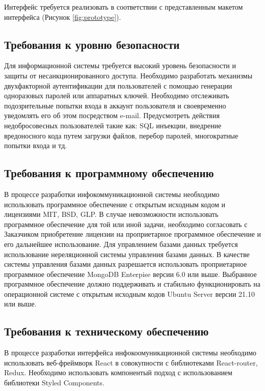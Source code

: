 \documentclass[14pt]{extreport}
\begin{document}
            Интерфейс требуется реализовать в соответствии с представленным макетом интерфейса (Рисунок \ref{fig:prototype}). 
     
        \subsection{Требования к уровню безопасности}
            
            Для информационной системы требуется высокий уровень безопасности и защиты от несанкционированного доступа. Необходимо разработать механизмы двухфакторной аутентификации для пользователей с помощью генерации одноразовых паролей или аппаратных ключей. Необходимо отслеживать подозрительные попытки входа в аккаунт пользователя и своевременно уведомлять его об этом посредством e-mail. Предусмотреть действия недобросовесных пользователей такие как: SQL инъекции, внедрение вредоносного кода путем загрузки файлов, перебор паролей, многократные попытки входа и тд. 

        \subsection{Требования к программному обеспечению}

            В процессе разработки инфокоммуникационной системы необходимо использовать программное обеспечение с открытым исходным кодом и лицензиями MIT, BSD, GLP. В случае невозможности использовать программное обеспечение для той или иной задачи, необходимо согласовать с Заказчиком приобретение лицензии на проприетарное программное обеспечение и его дальнейшее использование. Для управлением базами данных требуется использование нереляционной системы управления базами данных. В качестве системы управления базами данных разрешается использовать проприетарное программное обеспечение MongoDB Enterpise версии 6.0 или выше. Выбранное программное обеспечение должно поддерживать и стабильно функционировать на операционной системе с открытым исходным кодов Ubuntu Server версии 21.10 или выше.  
        \subsection{Требования к техническому обеспечению}

            В процессе разработки интерфейса инфокоомуникационной системы необходимо использовать веб-фреймворк React в совокупности с библиотеками React-router, Redux. Необходимо использовать компонентый подход с использованием библиотеки Styled Components. 
\end{document}
